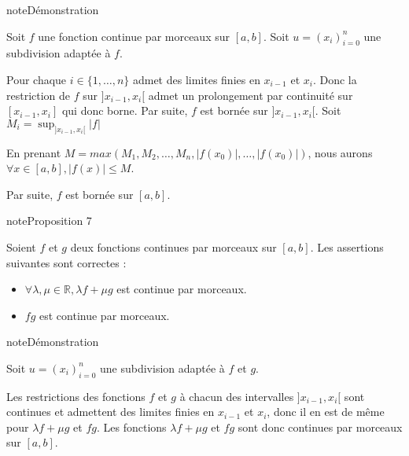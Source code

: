 \documentclass[letterpaper,10pt,french]{sphinxmanual}
\begin{document}
\begin{sphinxadmonition}{note}{Démonstration}

\sphinxAtStartPar
Soit \(f\) une fonction continue par morceaux sur  \([a, b]\). Soit \(u=(x_i)_{i=0}^n\) une subdivision adaptée à \(f\).

\sphinxAtStartPar
Pour chaque \(i \in \{1, \ldots, n\}\) admet des limites finies en \(x_{i-1}\) et \(x_i\). Donc la restriction de \(f\) sur \(]x_{i-1}, x_i[\) admet un prolongement par continuité sur \([x_{i-1}, x_i]\) qui donc borne. Par suite, \(f\) est bornée sur \(]x_{i-1}, x_i[\). Soit \(M_i = \sup_{]x_{i-1}, x_i[}|f|\)

\sphinxAtStartPar
En prenant \(M = max (M_1, M_2, \ldots, M_n, |f(x_0)|, \ldots, |f(x_0)|)\), nous aurons \(\forall x \in [a, b], |f(x)| \leq M\).

\sphinxAtStartPar
Par suite, \(f\) est bornée sur \([a, b]\).
\end{sphinxadmonition}

\begin{sphinxadmonition}{note}{Proposition 7}

\sphinxAtStartPar
Soient \(f\) et \(g\) deux fonctions continues par morceaux sur \([a,b]\). Les assertions suivantes sont correctes :
\begin{itemize}
\item {} 
\sphinxAtStartPar
\( \forall \lambda, \mu \in \mathbb R, \lambda f + \mu g\) est continue par morceaux.

\item {} 
\sphinxAtStartPar
\(fg\) est continue par morceaux.

\end{itemize}
\end{sphinxadmonition}

\begin{sphinxadmonition}{note}{Démonstration}

\sphinxAtStartPar
Soit \(u=(x_i)_{i=0}^n\) une subdivision adaptée à \(f\) et \(g\).

\sphinxAtStartPar
Les restrictions des fonctions \(f\) et \(g\) à chacun des intervalles \( ]x_{i-1}, x_i[\) sont continues et admettent des limites finies en  \(x_{i-1}\) et \(x_i\), donc il en est de même pour \(\lambda f + \mu g\) et \(fg\). Les fonctions
\(\lambda f + \mu g\) et \(fg\) sont donc continues par morceaux sur \([a, b]\).
\end{sphinxadmonition}
\end{document}
